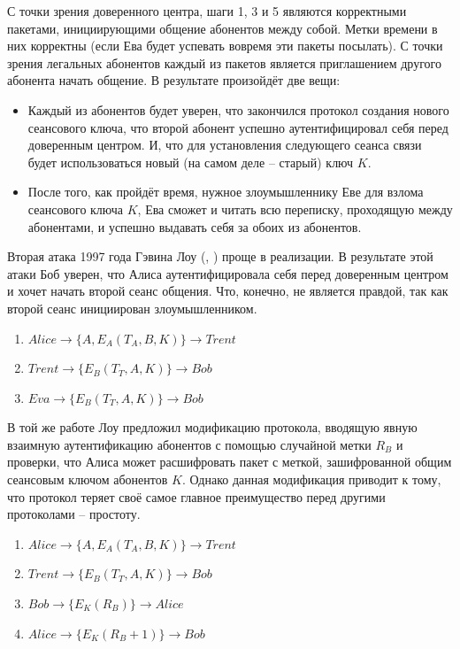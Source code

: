 С точки зрения доверенного центра, шаги 1, 3 и 5 являются корректными пакетами, инициирующими общение абонентов между собой. Метки времени в них корректны (если Ева будет успевать вовремя эти пакеты посылать). С точки зрения легальных абонентов каждый из пакетов является приглашением другого абонента начать общение. В результате произойдёт две вещи:

\begin{itemize}
	\item Каждый из абонентов будет уверен, что закончился протокол создания нового сеансового ключа, что второй абонент успешно аутентифицировал себя перед доверенным центром. И, что для установления следующего сеанса связи будет использоваться новый (на самом деле -- старый) ключ $K$.
	\item После того, как пройдёт время, нужное злоумышленнику Еве для взлома сеансового ключа $K$, Ева сможет и читать всю переписку, проходящую между абонентами, и успешно выдавать себя за обоих из абонентов.
\end{itemize}

Вторая атака 1997 года Гэвина Лоу (, \cite{Lowe:1997}) проще в реализации. В результате этой атаки Боб уверен, что Алиса аутентифицировала себя перед доверенным центром и хочет начать второй сеанс общения. Что, конечно, не является правдой, так как второй сеанс инициирован злоумышленником.

\begin{enumerate}
	\item $ Alice \rightarrow \{ A, E_A \left( T_A, B, K \right) \} \rightarrow Trent $
	\item $ Trent \rightarrow \{ E_B \left( T_T, A, K \right) \} \rightarrow Bob $
	\item $ Eva \rightarrow \{ E_B \left( T_T, A, K \right) \} \rightarrow Bob $
\end{enumerate}

В той же работе Лоу предложил модификацию протокола, вводящую явную взаимную аутентификацию абонентов с помощью случайной метки $R_B$ и проверки, что Алиса может расшифровать пакет с меткой, зашифрованной общим сеансовым ключом абонентов $K$. Однако данная модификация приводит к тому, что протокол теряет своё самое главное преимущество перед другими протоколами -- простоту.

\begin{enumerate}
	\item $ Alice \rightarrow \{ A, E_A \left( T_A, B, K \right) \} \rightarrow Trent $
	\item $ Trent \rightarrow \{ E_B \left( T_T, A, K \right) \} \rightarrow Bob $
	\item $ Bob \rightarrow \{ E_K \left( R_B \right) \} \rightarrow Alice $
	\item $ Alice \rightarrow \{ E_K \left( R_B + 1 \right) \} \rightarrow Bob $
\end{enumerate}

